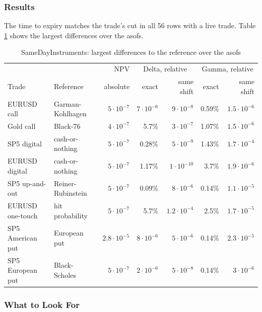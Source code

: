 \documentclass[12pt, a4paper]{article}
\begin{document}
\subsubsection*{Results}

The time to expiry matches the trade's cut in all 56 rows with a live trade. Table \ref{tab:instruments} shows the
largest differences over the asofs.

\begin{table}[H]
\centering
\footnotesize
\setlength{\tabcolsep}{4pt}
\begin{tabular}{|l|l|r|r|r|r|r|}
\hline
 & & NPV & \multicolumn{2}{c|}{Delta, relative} & \multicolumn{2}{c|}{Gamma, relative} \\
Trade & Reference & absolute & exact & same shift & exact & same shift \\
\hline
EURUSD call & Garman-Kohlhagen & $5\cdot10^{-7}$ & $7\cdot10^{-6}$ & $9\cdot10^{-8}$ & 0.59\% & $1.5\cdot10^{-6}$ \\
Gold call & Black-76 & $4\cdot10^{-7}$ & 5.7\% & $3\cdot10^{-7}$ & 1.07\% & $1.5\cdot10^{-6}$ \\
SP5 digital & cash-or-nothing & $5\cdot10^{-7}$ & 0.28\% & $5\cdot10^{-9}$ & 1.43\% & $1.7\cdot10^{-4}$ \\
EURUSD digital & cash-or-nothing & $5\cdot10^{-7}$ & 1.17\% & $1\cdot10^{-10}$ & 3.7\% & $1.9\cdot10^{-6}$ \\
SP5 up-and-out & Reiner-Rubinstein & $5\cdot10^{-7}$ & 0.09\% & $8\cdot10^{-6}$ & 0.14\% & $1.1\cdot10^{-5}$ \\
EURUSD one-touch & hit probability & $5\cdot10^{-7}$ & 5.7\% & $1.2\cdot10^{-4}$ & 2.5\% & $1.7\cdot10^{-5}$ \\
SP5 American put & European put & $2.8\cdot10^{-5}$ & $8\cdot10^{-6}$ & $5\cdot10^{-6}$ & 0.14\% & $2.3\cdot10^{-5}$ \\
SP5 European put & Black-Scholes & $5\cdot10^{-7}$ & $2\cdot10^{-6}$ & $5\cdot10^{-8}$ & 0.14\% & $3\cdot10^{-6}$ \\
\hline
\end{tabular}
\caption{SameDayInstruments: largest differences to the reference over the asofs}
\label{tab:instruments}
\end{table}

\subsubsection*{What to Look For}
\end{document}
